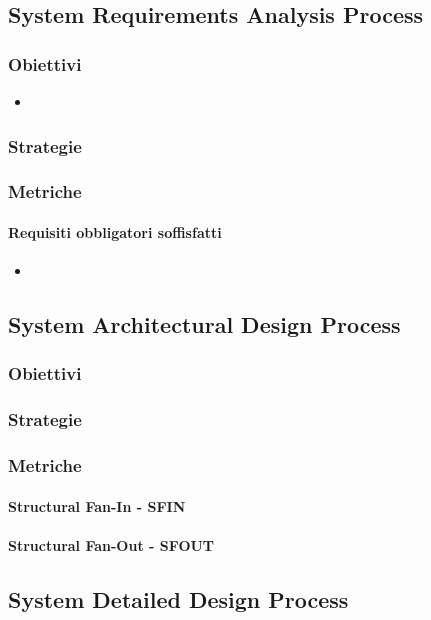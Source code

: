 	\subsection{System Requirements Analysis Process}
\subsubsection{Obiettivi}
\begin{itemize}
	\item
\end{itemize}
\subsubsection{Strategie}
\subsubsection{Metriche}
\paragraph{Requisiti obbligatori soffisfatti}
\begin{itemize}
	\item
\end{itemize}

	\subsection{System Architectural Design Process}
		\subsubsection{Obiettivi}
		\subsubsection{Strategie}
		\subsubsection{Metriche}
			\paragraph{Structural Fan-In - SFIN}
			\paragraph{Structural Fan-Out - SFOUT}


	\subsection{System Detailed Design Process}
